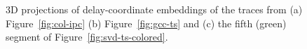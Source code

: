  \begin{figure}[!ht]
    \hfill
        \hfill
    \caption{3D projections of delay-coordinate embeddings of the
       traces from (a) Figure~\ref{fig:col-ipc} (b)
       Figure~\ref{fig:gcc-ts} and (c) the fifth (green) segment of
       Figure~\ref{fig:svd-ts-colored}.}
    \label{fig:embedding}
  \end{figure}
%

